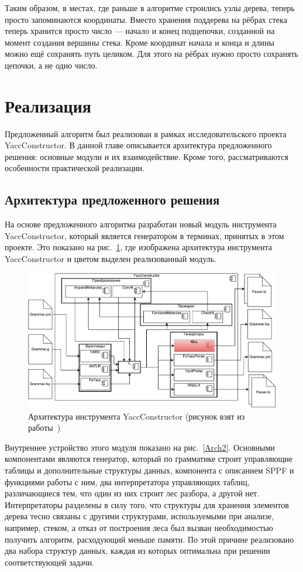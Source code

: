 \documentclass[14pt]{matmex-diploma}
\begin{document}
Таким образом, в местах, где раньше в алгоритме строились узлы дерева, теперь просто запоминаются координаты. Вместо хранения поддерева на рёбрах стека теперь хранится просто число --- начало и конец подцепочки, созданной на момент создания вершины стека. Кроме координат начала и конца и длины можно ещё сохранять путь целиком. Для этого на рёбрах нужно просто сохранять цепочки, а не одно число. 

\section{Реализация}
Предложенный алгоритм был реализован в рамках исследовательского проекта YaccConstructor. В данной главе описывается архитектура предложенного решения: основные модули и их взаимодействие. Кроме того, рассматриваются особенности практической реализации.

\subsection{Архитектура предложенного решения}
На основе предложенного алгоритма разработан новый модуль инструмента YaccConstructor, который является генератором в терминах, принятых в этом проекте. Это показано на рис.~\ref{Arch}, где изображена архитектура инструмента YaccConstructor и цветом выделен реализованный модуль.

\begin{figure}[h]
 \centering
 \includegraphics[width=15cm]{pics/Arch.pdf}
 \caption{Архитектура инструмента YaccConstructor (рисунок взят из работы~\cite{GrigorievPhd})}
 \label{Arch}
\end{figure}

Внутреннее устройство этого модуля показано на рис.~\ref{Arch2}. Основными компонентами являются генератор, который по грамматике строит управляющие таблицы и дополнительные структуры данных, компонента с описанием SPPF и функциями работы с ним, два интерпретатора управляющих таблиц, различающиеся тем, что один из них строит лес разбора, а другой нет. Интерпретаторы разделены в силу того, что структуры для хранения элементов дерева тесно связаны с другими структурами, используемыми при анализе, например, стеком, а отказ от построения леса был вызван необходимостью получить алгоритм, расходующий меньше памяти. По этой причине реализовано два набора структур данных, каждая из которых оптимальна при решении соответствующей задачи.
\end{document}
